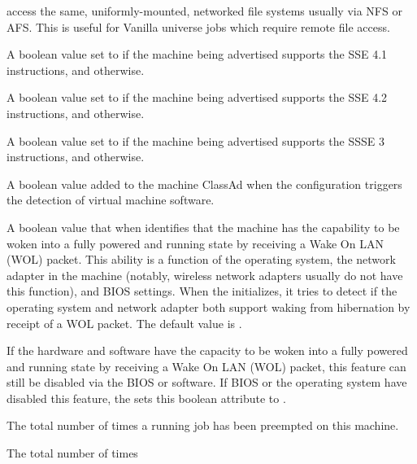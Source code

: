 \begin{description}
access the same, uniformly-mounted, networked file systems usually via
NFS or AFS.  This is useful for Vanilla universe jobs which require
remote file access.
%
\item[\AdAttr{Has\_sse4\_1}:] A boolean value set to 
 if the machine being advertised supports
the SSE 4.1 instructions, and  otherwise.
%
\item[\AdAttr{Has\_sse4\_2}:] A boolean value set to 
if the machine being advertised supports
the SSE 4.2 instructions, and  otherwise.
%
\item[\AdAttr{has\_ssse3}:] A boolean value set to 
if the machine being advertised supports
the SSSE 3 instructions, and  otherwise.
%
\item[\AdAttr{HasVM}:] A boolean value added to the machine ClassAd
when the configuration triggers the detection of virtual machine
software.
%
\item[\AdAttr{IsWakeAble}:] A boolean value that when  identifies
that the machine has the capability to be woken into a 
fully powered and running state by receiving a Wake On LAN (WOL) packet.
This ability is a function of the operating system, 
the network adapter in the machine 
(notably, wireless network adapters usually do not have this function),
and BIOS settings. 
When the  initializes, 
it tries to detect if the operating system and network adapter both support 
waking from hibernation by receipt of a WOL packet.
The default value is .
%
\item[\AdAttr{IsWakeEnabled}:] If the hardware and software have the capacity 
to be woken into a fully powered and running state by receiving 
a Wake On LAN (WOL) packet,
this feature can still be disabled via the BIOS or software.
If BIOS or the operating system have disabled this feature, 
the  sets this boolean attribute to .
%
\item[\AdAttr{JobPreemptions}:] The total number of times
a running job has been preempted on this machine.  
%
\item[\AdAttr{JobRankPreemptions}:] The total number of times

\end{description}
